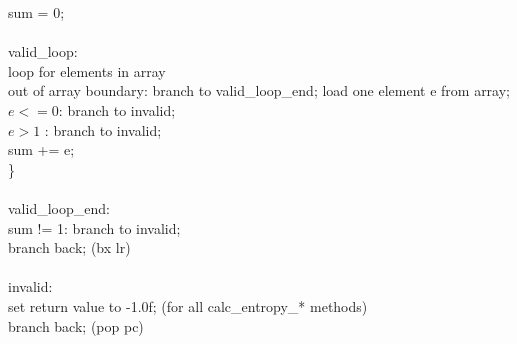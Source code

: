 \documentclass[11pt]{article}
\begin{document}
{{	sum = 0;\\\\
valid\_loop:\\
	loop for elements in array{\\
		out of array boundary: branch to valid\_loop\_end;
		load one element e from array;\\
		$e <= 0$: branch to invalid;\\
		$e > 1$ : branch to invalid;\\
		sum += e;\\
\}\\\\
valid\_loop\_end:\\
	sum != 1: branch to invalid;\\
	branch back; (bx lr)\\\\
invalid:\\
	set return value to -1.0f; (for all calc\_entropy\_* methods)\\
	branch back; (pop {pc}) \\



}}}
\end{document}
